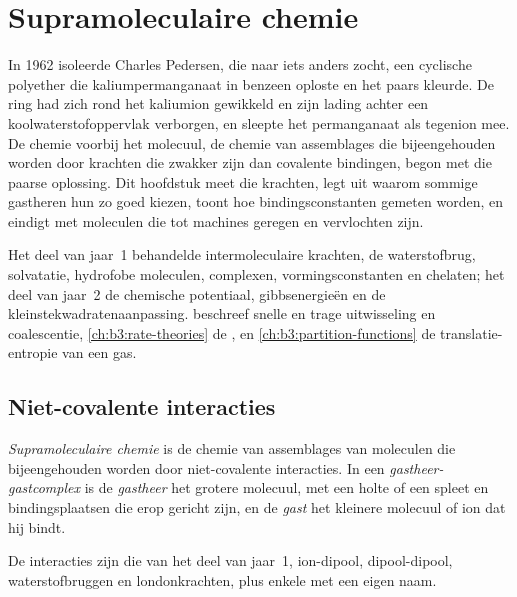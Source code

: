 \chapter{Supramoleculaire chemie}\label{ch:b3:supramolecular}

In 1962 isoleerde Charles Pedersen, die naar iets anders zocht, een
cyclische polyether die kaliumpermanganaat in benzeen oploste en het
paars kleurde. De ring had zich rond het kaliumion gewikkeld en zijn
lading achter een koolwaterstofoppervlak verborgen, en sleepte het
permanganaat als tegenion mee. De chemie voorbij het molecuul, de chemie
van assemblages die bijeengehouden worden door krachten die zwakker zijn
dan covalente bindingen, begon met die paarse oplossing.
Dit hoofdstuk meet die krachten, legt uit waarom sommige gastheren hun
 zo goed kiezen, toont hoe bindingsconstanten gemeten worden, en
eindigt met moleculen die tot machines geregen en vervlochten zijn.

\begin{recall}
Het deel van jaar~1 behandelde intermoleculaire krachten, de
waterstofbrug, solvatatie, hydrofobe moleculen, complexen,
vormingsconstanten en chelaten; het deel van jaar~2 de chemische
potentiaal, gibbsenergieën en de kleinstekwadratenaanpassing.
 beschreef snelle en trage uitwisseling en
coalescentie,
\cref{ch:b3:rate-theories} de , en
\cref{ch:b3:partition-functions} de translatie-entropie van een gas.
\end{recall}

\section{Niet-covalente interacties}

\begin{definition}\label{def:b3:supramolecular:supramolecular}
\emph{Supramoleculaire chemie} is de chemie
van assemblages van moleculen die bijeengehouden worden door
niet-covalente interacties. In een
\emph{gastheer-gastcomplex} is de
\emph{gastheer} het grotere molecuul, met een holte of een
spleet en bindingsplaatsen die erop gericht zijn, en de
\emph{gast} het kleinere molecuul of ion dat hij bindt.
\end{definition}

De interacties zijn die van het deel van jaar~1, ion-dipool,
dipool-dipool, waterstofbruggen en londonkrachten, plus enkele met een
eigen naam.

